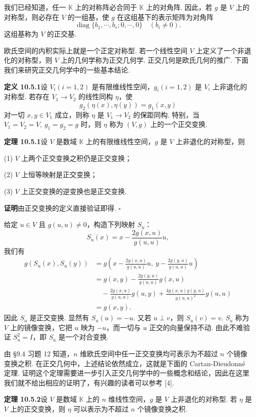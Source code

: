 \documentclass[UTF8, 12pt, fontset=fandol, oneside]{ctexart}
\begin{document}
我们已经知道，任一 $\mathbb K$ 上的对称阵必合同于 $\mathbb K$ 上的对角阵. 因此，若 $g$ 是 $V$ 上的对称型，则必存在 $V$ 的一组基，使 $g$ 在这组基下的表示矩阵为对角阵
\[
  \operatorname{diag}\{b_1,\cdots,b_r;0,\cdots,0\}\quad (b_i\ne0).
\]
这组基称为 $V$ 的正交基.

欧氏空间的内积实际上就是一个正定对称型. 若一个线性空间 $V$ 上定义了一个非退化的对称型，则 $V$ 上的几何学称为正交几何学. 正交几何是欧氏几何的推广. 下面我们来研究正交几何学中的一些基本结论.

\noindent\textbf{定义 10.5.1}\quad 设 $V_i(i=1,2)$ 是有限维线性空间，$g_i(i=1,2)$ 是 $V_i$ 上非退化的对称型. 若存在 $V_1\to V_2$ 的线性同构 $\eta$，使
\[
  g_2(\eta(x),\eta(y))=g_1(x,y)
\]
对一切 $x,y\in V_1$ 成立，则称 $\eta$ 是 $V_1\to V_2$ 的保距同构. 特别，当 $V_1=V_2=V,\ g_1=g_2=g$ 时，则 $\eta$ 称为 $(V,g)$ 上的一个正交变换.

\noindent\textbf{定理 10.5.1}\quad 设 $V$ 是数域 $\mathbb K$ 上的有限维线性空间，$g$ 是 $V$ 上非退化的对称型，则

(1) $V$ 上两个正交变换之积仍是正交变换；

(2) $V$ 上恒等映射是正交变换；

(3) $V$ 上正交变换的逆变换也是正交变换.

\noindent\textbf{证明}\quad 由正交变换的定义直接验证即得. $\square$

给定 $u\in V$ 且 $g(u,u)\ne0$，构造下列映射 $S_u$：
\[
  S_u(x)=x-\frac{2g(x,u)}{g(u,u)}u,
\]
我们有
\[
\begin{aligned}
  g(S_u(x),S_u(y))
  &=g\left(x-\frac{2g(x,u)}{g(u,u)}u,\ y-\frac{2g(y,u)}{g(u,u)}u\right)\\
  &=g(x,y)-\frac{2g(y,u)}{g(u,u)}g(x,u)\\
  &\quad-\frac{2g(x,u)}{g(u,u)}g(u,y)
  +\frac{4g(x,u)g(y,u)}{g(u,u)^2}g(u,u)\\
  &=g(x,y).
\end{aligned}
\]
因此 $S_u$ 是正交变换. 显然有 $S_u(u)=-u$. 又若 $u\perp v$，则 $S_u(v)=v$. $S_u$ 称为 $V$ 上的镜像变换，它把 $u$ 映为 $-u$，而一切与 $u$ 正交的向量保持不动. 由此不难验证 $S_u^2=I$，即 $S_u$ 是一个对合变换.

由 §9.4 习题 12 知道，$n$ 维欧氏空间中任一正交变换均可表示为不超过 $n$ 个镜像变换之积. 在正交几何中，上述结论依然成立，这就是下面的 Cartan-Dieudonné 定理. 证明这个定理需要进一步引入正交几何学中的一些概念和结论，因此在这里我们就不给出相应的证明了，有兴趣的读者可以参考 [4].

\noindent\textbf{定理 10.5.2}\quad 设 $V$ 是数域 $\mathbb K$ 上的 $n$ 维线性空间，$g$ 是 $V$ 上非退化的对称型. 若 $\eta$ 是 $V$ 上的正交变换，则 $\eta$ 可以表示为不超过 $n$ 个镜像变换之积.
\end{document}
